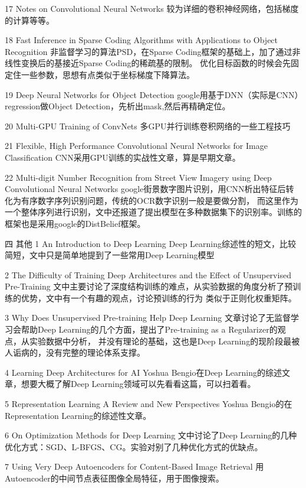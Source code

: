 17 Notes on Convolutional Neural Networks
   较为详细的卷积神经网络，包括梯度的计算等等。

18 Fast Inference in Sparse Coding Algorithms with Applications to Object Recognition
   非监督学习的算法PSD，在Sparse Coding框架的基础上，加了通过非线性变换后的基接近Sparse Coding的稀疏基的限制。
   优化目标函数的时候会先固定住一些参数，思想有点类似于坐标梯度下降算法。

19 Deep Neural Networks for Object Detection
   google用基于DNN（实际是CNN）regression做Object Detection，先析出mask,然后再精确定位。

20 Multi-GPU Training of ConvNets
   多GPU并行训练卷积网络的一些工程技巧

21 Flexible, High Performance Convolutional Neural Networks for Image Classification
   CNN采用GPU训练的实战性文章，算是早期文章。

22 Multi-digit Number Recognition from Street View Imagery using Deep Convolutional Neural Networks
   google街景数字图片识别，用CNN析出特征后转化为有序数字序列识别问题，传统的OCR数字识别一般是要做分割，
   而这里作为一个整体序列进行识别，文中还报道了提出模型在多种数据集下的识别率。训练的框架也是采用google的DistBelief框架。

四 其他
1 An Introduction to Deep Learning
  Deep Learning综述性的短文，比较简短，文中只是简单地提到了一些常用Deep Learning模型

2 The Difficulty of Training Deep Architectures and the Effect of Unsupervised Pre-Training
  文中主要讨论了深度结构训练的难点，从实验数据的角度分析了预训练的优势，文中有一个有趣的观点，讨论预训练的行为
  类似于正则化权重矩阵。

3 Why Does Unsupervised Pre-training Help Deep Learning
  文章讨论了无监督学习会帮助Deep Learning的几个方面，提出了Pre-training as a Regularizer的观点，从实验数据中分析，
  并没有理论的基础，这也是Deep Learning的现阶段最被人诟病的，没有完整的理论体系支撑。

4 Learning Deep Architectures for AI
  Yoshua Bengio在Deep Learning的综述文章，想要大概了解Deep Learning领域可以先看看这篇，可以扫着看。

5 Representation Learning A Review and New Perspectives
  Yoshua Bengio的在Representation Learning的综述性文章。

6 On Optimization Methods for Deep Learning
  文中讨论了Deep Learning的几种优化方式：SGD、L-BFGS、CG。实验对别了几种优化方式的优缺点。

7 Using Very Deep Autoencoders for Content-Based Image Retrieval
  用Autoencoder的中间节点表征图像全局特征，用于图像搜索。

